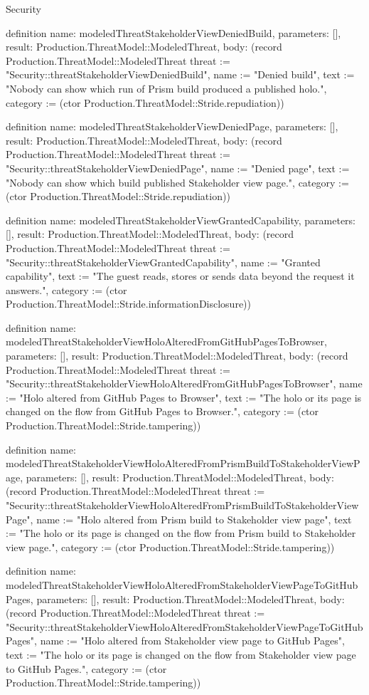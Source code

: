\begin{lexlean}{Security}
\begin{semanticmodule}
definition{
  name: modeledThreatStakeholderViewDeniedBuild,
  parameters: [],
  result: Production.ThreatModel::ModeledThreat,
  body: (record Production.ThreatModel::ModeledThreat {threat := "Security::threatStakeholderViewDeniedBuild", name := "Denied build", text := "Nobody can show which run of Prism build produced a published holo.", category := (ctor Production.ThreatModel::Stride.repudiation)})
}

definition{
  name: modeledThreatStakeholderViewDeniedPage,
  parameters: [],
  result: Production.ThreatModel::ModeledThreat,
  body: (record Production.ThreatModel::ModeledThreat {threat := "Security::threatStakeholderViewDeniedPage", name := "Denied page", text := "Nobody can show which build published Stakeholder view page.", category := (ctor Production.ThreatModel::Stride.repudiation)})
}

definition{
  name: modeledThreatStakeholderViewGrantedCapability,
  parameters: [],
  result: Production.ThreatModel::ModeledThreat,
  body: (record Production.ThreatModel::ModeledThreat {threat := "Security::threatStakeholderViewGrantedCapability", name := "Granted capability", text := "The guest reads, stores or sends data beyond the request it answers.", category := (ctor Production.ThreatModel::Stride.informationDisclosure)})
}

definition{
  name: modeledThreatStakeholderViewHoloAlteredFromGitHubPagesToBrowser,
  parameters: [],
  result: Production.ThreatModel::ModeledThreat,
  body: (record Production.ThreatModel::ModeledThreat {threat := "Security::threatStakeholderViewHoloAlteredFromGitHubPagesToBrowser", name := "Holo altered from GitHub Pages to Browser", text := "The holo or its page is changed on the flow from GitHub Pages to Browser.", category := (ctor Production.ThreatModel::Stride.tampering)})
}

definition{
  name: modeledThreatStakeholderViewHoloAlteredFromPrismBuildToStakeholderViewPage,
  parameters: [],
  result: Production.ThreatModel::ModeledThreat,
  body: (record Production.ThreatModel::ModeledThreat {threat := "Security::threatStakeholderViewHoloAlteredFromPrismBuildToStakeholderViewPage", name := "Holo altered from Prism build to Stakeholder view page", text := "The holo or its page is changed on the flow from Prism build to Stakeholder view page.", category := (ctor Production.ThreatModel::Stride.tampering)})
}

definition{
  name: modeledThreatStakeholderViewHoloAlteredFromStakeholderViewPageToGitHubPages,
  parameters: [],
  result: Production.ThreatModel::ModeledThreat,
  body: (record Production.ThreatModel::ModeledThreat {threat := "Security::threatStakeholderViewHoloAlteredFromStakeholderViewPageToGitHubPages", name := "Holo altered from Stakeholder view page to GitHub Pages", text := "The holo or its page is changed on the flow from Stakeholder view page to GitHub Pages.", category := (ctor Production.ThreatModel::Stride.tampering)})
}


\end{semanticmodule}
\end{lexlean}
